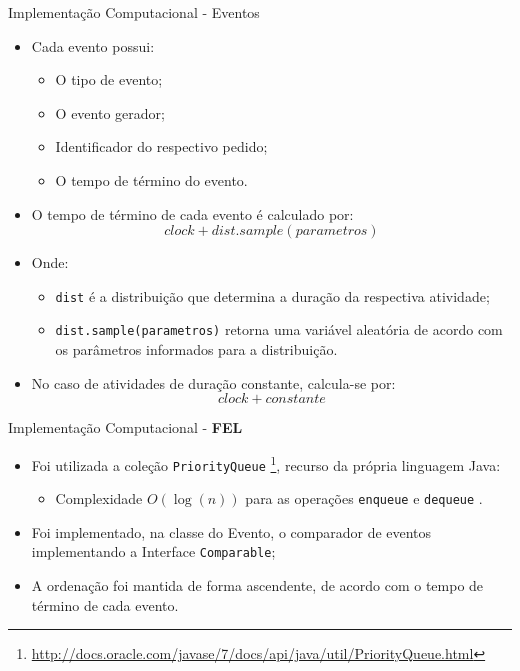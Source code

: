 \documentclass[xcolor=dvipsnames]{beamer}
\let\olditem=\item%
\renewcommand{\item}{\olditem \justifying}%
\begin{document}
\begin{frame}{Implementação Computacional - Eventos}
\fontsize{10pt}{7.2}\selectfont
	\begin{itemize}
		\item Cada evento possui:
        \medskip
		      \begin{itemize}
		      	\item O tipo de evento;
		      	      \bigskip
		      	\item O evento gerador;
		      	      \bigskip
		      	\item Identificador do respectivo pedido;
		      	      \bigskip
		      	\item O tempo de término do evento.
		      	      \bigskip
		      \end{itemize}
		\item O tempo de término de cada evento é calculado por: $$ clock + dist.sample(parametros) $$
		\item Onde:
        \medskip
		      \begin{itemize}
		      	\item \texttt{dist} é a distribuição que determina a duração da respectiva atividade;
		      	      \bigskip
		      	\item \texttt{dist.sample(parametros)} retorna uma variável aleatória de acordo com os parâmetros informados para a distribuição.
		      	      \bigskip
		      \end{itemize}
		\item No caso de atividades de duração constante, calcula-se por: $$ clock + constante $$
	\end{itemize}
\end{frame}
	
\begin{frame}{Implementação Computacional - \textbf{FEL}}
	\begin{itemize}
		\item Foi utilizada a coleção \texttt{PriorityQueue} \footnote{\url{http://docs.oracle.com/javase/7/docs/api/java/util/PriorityQueue.html}}, recurso da própria linguagem Java:
        \medskip
		      \begin{itemize}
		      	\item Complexidade $O(\log(n))$ para as operações \texttt{enqueue} e \texttt{dequeue} \Smiley.
		      \end{itemize}
		      \bigskip
		\item Foi implementado, na classe do Evento, o comparador de eventos implementando a Interface \texttt{Comparable};
		      \bigskip
		\item A ordenação foi mantida de forma ascendente, de acordo com o tempo de término de cada evento.
	\end{itemize}
\end{frame}
	
\end{document}
